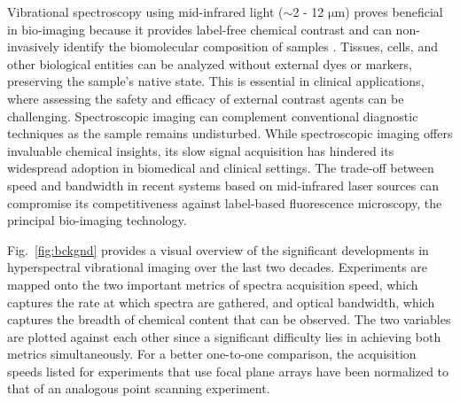 \documentclass{optica-article}
\begin{document}
Vibrational spectroscopy using mid-infrared light ($\sim$2 - 12 $\mathrm{\mu m}$) proves beneficial in bio-imaging because it provides label-free chemical contrast and can non-invasively identify the biomolecular composition of samples \cite{bakerUsingFourierTransform2014}. Tissues, cells, and other biological entities can be analyzed without external dyes or markers, preserving the sample's native state. This is essential in clinical applications, where assessing the safety and efficacy of external contrast agents can be challenging. Spectroscopic imaging can complement conventional diagnostic techniques as the sample remains undisturbed. While spectroscopic imaging offers invaluable chemical insights, its slow signal acquisition has hindered its widespread adoption in biomedical and clinical settings. The trade-off between speed and bandwidth in recent systems \cite{zhangDepthresolvedMidinfraredPhotothermal2016,koleDiscreteFrequencyInfrared2012,yehFastInfraredChemical2015}  based on mid-infrared laser sources can compromise its competitiveness against label-based fluorescence microscopy, the principal bio-imaging technology.

\mbox{Fig. \ref{fig:bckgnd}} provides a visual overview of the significant developments in hyperspectral vibrational imaging over the last two decades. Experiments are mapped onto the two important metrics of spectra acquisition speed, which captures the rate at which spectra are gathered, and optical bandwidth, which captures the breadth of chemical content that can be observed. The two variables are plotted against each other since a significant difficulty lies in achieving both metrics simultaneously. For a better one-to-one comparison, the acquisition speeds listed for experiments that use focal plane arrays have been normalized to that of an analogous point scanning experiment.

\end{document}
